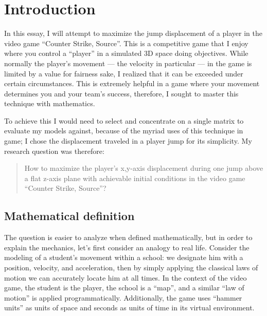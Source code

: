 \section{Introduction}


In this essay, I will attempt to maximize the jump displacement of a player in the video game ``Counter Strike, Source''. This is a competitive game that I enjoy where you control a ``player'' in a simulated 3D space doing objectives. While normally the player's movement --- the velocity in particular --- in the game is limited by a value for fairness sake, I realized that it can be exceeded under certain circumstances. This is extremely helpful in a game where your movement determines you and your team's success, therefore, I sought to master this technique with mathematics.


To achieve this I would need to select and concentrate on a single matrix to evaluate my models against, because of the myriad uses of this technique in game; I chose the displacement traveled in a player jump for its simplicity. My research question was therefore:
\begin{quote}
    How to maximize the player's x,y-axis displacement during one jump above a flat z-axis plane with achievable initial conditions in the video game ``Counter Strike, Source''?
\end{quote}

\subsection{Mathematical definition}
The question is easier to analyze when defined mathematically, but in order to explain the mechanics, let's first consider an analogy to real life. Consider the modeling of a student's movement within a school: we designate him with a position, velocity, and acceleration, then by simply applying the classical laws of motion we can accurately locate him at all times. In the context of the video game, the student is the player, the school is a ``map'', and a similar ``law of motion'' is applied programmatically. Additionally, the game uses ``hammer units'' as units of space and seconds as units of time in its virtual environment.


